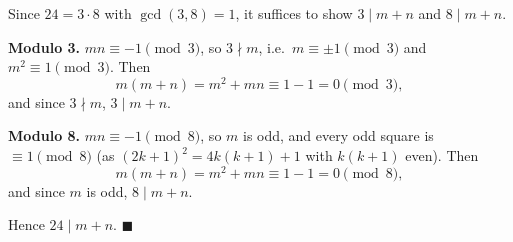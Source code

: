 Since $24=3\cdot8$ with $\gcd(3,8)=1$, it suffices to show $3\mid m+n$ and $8\mid m+n$.

\textbf{Modulo 3.} $mn\equiv-1\pmod3$, so $3\nmid m$, i.e.\ $m\equiv\pm1\pmod3$ and $m^2\equiv1\pmod3$. Then
\[
m(m+n)=m^2+mn\equiv1-1=0\pmod3,
\]
and since $3\nmid m$, $3\mid m+n$.

\textbf{Modulo 8.} $mn\equiv-1\pmod8$, so $m$ is odd, and every odd square is $\equiv1\pmod8$ (as $(2k+1)^2=4k(k+1)+1$ with $k(k+1)$ even). Then
\[
m(m+n)=m^2+mn\equiv1-1=0\pmod8,
\]
and since $m$ is odd, $8\mid m+n$.

Hence $24\mid m+n$. $\blacksquare$

